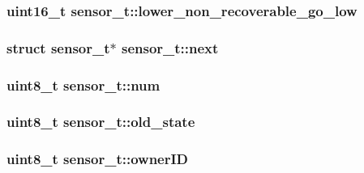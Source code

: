 \hypertarget{structsensor__t_a7b7512bfa4d79e702d933aab18183fac}{
\subsubsection[{lower\-\_\-non\-\_\-recoverable\-\_\-go\-\_\-low}]{\setlength{\rightskip}{0pt plus 5cm}uint16\-\_\-t sensor\-\_\-t\-::lower\-\_\-non\-\_\-recoverable\-\_\-go\-\_\-low}}\label{structsensor__t_a7b7512bfa4d79e702d933aab18183fac}
\hypertarget{structsensor__t_a3a6e7046e6865b0baa88be87ae6765b0}{
\subsubsection[{next}]{\setlength{\rightskip}{0pt plus 5cm}struct {\bf sensor\-\_\-t}$\ast$ sensor\-\_\-t\-::next}}\label{structsensor__t_a3a6e7046e6865b0baa88be87ae6765b0}
\hypertarget{structsensor__t_aa53d919c174719ce93176510d0411ad1}{
\subsubsection[{num}]{\setlength{\rightskip}{0pt plus 5cm}uint8\-\_\-t sensor\-\_\-t\-::num}}\label{structsensor__t_aa53d919c174719ce93176510d0411ad1}
\hypertarget{structsensor__t_a4b1293e20318142e7d0b2fa97958dab0}{
\subsubsection[{old\-\_\-state}]{\setlength{\rightskip}{0pt plus 5cm}uint8\-\_\-t sensor\-\_\-t\-::old\-\_\-state}}\label{structsensor__t_a4b1293e20318142e7d0b2fa97958dab0}
\hypertarget{structsensor__t_aea9f6e8d77f9cf45e7bfae93bcf358a7}{
\subsubsection[{owner\-I\-D}]{\setlength{\rightskip}{0pt plus 5cm}uint8\-\_\-t sensor\-\_\-t\-::owner\-I\-D}}\label{structsensor__t_aea9f6e8d77f9cf45e7bfae93bcf358a7}
